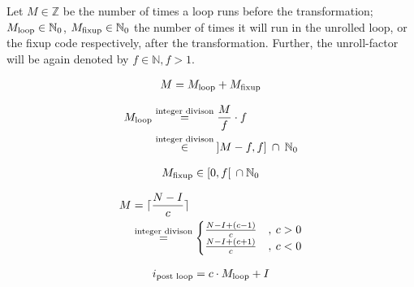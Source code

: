 Let $M \in \mathbb{Z}$ be the number of times a loop runs before the transformation; $M_{\text{loop}} \in \mathbb{N}_0$, $M_{\text{fixup}} \in \mathbb{N}_0$ the number of times it will run in the unrolled loop, or the fixup code respectively, after the transformation.
Further, the unroll-factor will be again denoted by $f \in \mathbb{N}, f > 1$.

\begin{equation}\label{eqn:impl:fixup:duff:conserve-semantics-identity}
    \begin{aligned}
        M = M_{\text{loop}} + M_{\text{fixup}}
    \end{aligned}
\end{equation}

\begin{equation}\label{eqn:impl:fixup:duff:loop-iterations}
    \begin{aligned}
        M_{\text{loop}} &\overset{\text{integer divison}}{=} \frac{M}{f} \cdot f\\
        &\overset{\text{integer divison}}{\in} \medspace \rbrack M-f,f \rbrack \medspace \cap \medspace \mathbb{N}_0
    \end{aligned}
\end{equation}

\begin{equation}\label{eqn:impl:fixup:duff:fixup-interval}
    \begin{aligned}
        M_{\text{fixup}} \in \lbrack0, f\lbrack \medspace \medspace \cap \medspace \mathbb{N}_0
    \end{aligned}
\end{equation}

\begin{equation}\label{eqn:impl:fixup:duff:total-iteration-based-on-bounds}
    \begin{aligned}
        M &= \lceil{}\frac{N - I}{c}\rceil{} \\
        & \overset{\text{integer divison}}{=}
        \begin{cases}
              \frac{N - I + (c - 1)}{c} &, \medspace c > 0\\
              \frac{N - I + (c + 1)}{c} &, \medspace c < 0
        \end{cases}
    \end{aligned}
\end{equation}

\begin{equation}\label{eqn:impl:fixup:duff:i-after-loop}
    \begin{aligned}
        i_\text{post loop} = c \cdot M_{\text{loop}} + I
    \end{aligned}
\end{equation}

